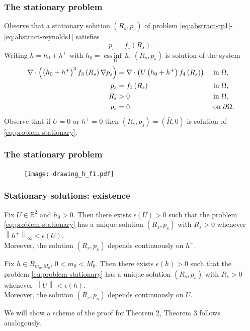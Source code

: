 \documentclass[10pt,aspectratio=169]{beamer}
\newenvironment{nalign}{
	\begin{equation}
	\begin{aligned}
}{
	\end{aligned}
	\end{equation}
	\ignorespacesafterend
}
\newcommand{\norm}[2]{\left\lVert#1\right\rVert_{#2}}
\DeclareMathOperator*{\essinf}{ess\,inf}
\begin{document}

\begin{frame}
\frametitle{The stationary problem}

Observe that a stationary solution $(R_s,p_s)$ of problem \eqref{eq:abstract-rp1}-\eqref{eq:abstract-reynolds1} satisfies
\begin{equation}
p_s=f_1\left(R_s\right).\label{eq:p_s}
\end{equation}
Writing $h=h_0+h^+$ with $h_0=\underset{\Omega}{\essinf{\,h}}$, $(R_s,p_s)$ is solution of the system
\begin{nalign}
	\nabla\cdot \left(\left(h_0+h^+\right)^3f_3\left(R_s\right)\nabla p_s\right)&=\nabla\cdot\left(U\left(h_0+h^+\right)f_4\left(R_s\right)\right)&&\textnormal{ in } \Omega,\\
	p_s&=f_1\left(R_s\right)&&\textnormal{ in } \Omega,\\
	R_s&>0&&\textnormal{ in } \Omega,\\
	p_s&=0&&\textnormal{ on }\partial \Omega.
	\label{eq:problem-stationary}
\end{nalign}
Observe that if $U=0$ or $h^+=0$ then $\left(R_s,p_s\right)=\left(\bar{R},0\right)$ is solution of \eqref{eq:problem-stationary}.


\end{frame} 

\begin{frame}
\frametitle{The stationary problem}

\begin{figure}[h]
	\texttt{[image: drawing\_h\_f1.pdf]}
\end{figure}

\end{frame} 


\begin{frame}
\frametitle{Stationary solutions: existence}
\begin{theorem}\label{theo:existence_U_fix}
	Fix $U\in\mathbb{R}^2$ and $h_0>0$. Then there exists $\epsilon\left(U\right)>0$ such that the problem \eqref{eq:problem-stationary} has a unique solution $\left(R_s,p_s\right)$ with $R_s>0$ whenever $\norm{h^+}{\infty}<\epsilon(U)$.\\ {\color{red}Moreover, the solution $\left(R_s,p_s\right)$ depends continuously on $h^+$}.
\end{theorem}
\begin{theorem}\label{theo:existence_h_fix}
	Fix $h\in B_{m_0,M_0}$, $0<m_0<M_0$. Then there exists $\epsilon\left(h\right)>0$ such that the problem \eqref{eq:problem-stationary} has a unique solution $\left(R_s,p_s\right)$ with $R_s>0$ whenever $\norm{U}{}<\epsilon\left(h\right)$.\\  {\color{red}Moreover, the solution $\left(R_s,p_s\right)$ depends continuously on $U$}.
\end{theorem}
\bigskip

We will show a scheme of the proof for Theorem 2, Theorem 3 follows analogously.
\end{frame} 
\end{document}
